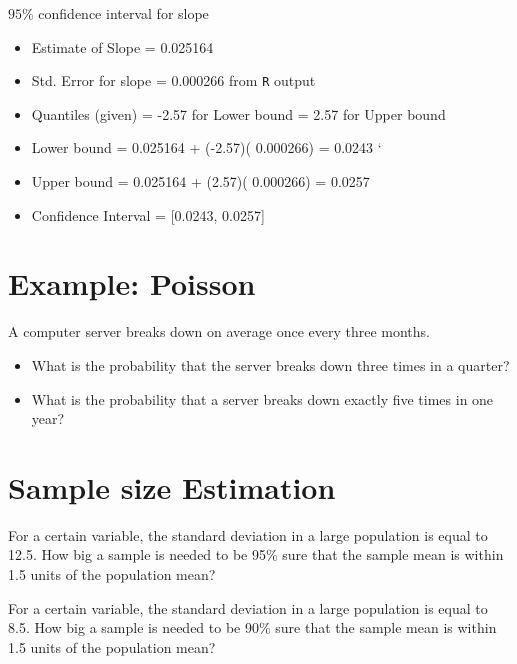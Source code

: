 $95\%$ confidence interval for slope
\begin{itemize}
\item Estimate of Slope     = 	0.025164
\item Std. Error for slope 	= 	0.000266 from \texttt{R} output
\item Quantiles (given) 	=	-2.57 	for Lower bound
				            =   2.57  	for Upper bound

\item Lower bound		=	0.025164 + (-2.57)( 0.000266)
				=	0.0243
`
\item Upper bound		=	0.025164 + (2.57)( 0.000266)
				=	0.0257

\item Confidence Interval = [0.0243, 0.0257]
\end{itemize}












\section{Example: Poisson}

A computer server breaks down on average once every three months.

\begin{itemize}
\item What is the probability that the server breaks down three times in a quarter?
\item What is the probability that a server breaks down exactly five times in one year?
\end{itemize}




\section{Sample size Estimation}
For a certain variable, the standard deviation in a large population is equal to 12.5.
How big a sample is needed to be 95\% sure that the sample mean is within 1.5 units of the population mean?


For a certain variable, the standard deviation in a large population is equal to 8.5.
How big a sample is needed to be 90\% sure that the sample mean is within 1.5
units of the population mean?



